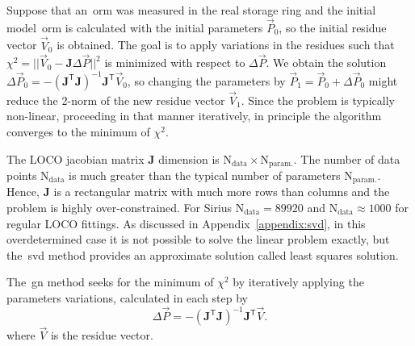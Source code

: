 Suppose that an~\gls{orm} was measured in the real storage ring and the initial model~\gls{orm} is calculated with the initial parameters $\vec{P}_0$, so the initial residue vector $\vec{V}_0$ is obtained. The goal is to apply variations in the residues such that $\chi^{2} = ||\vec{V}_0 - \mathbf{J}\Delta\vec{P}||^2 $ is minimized with respect to $\Delta\vec{P}$. We obtain the solution $\Delta \vec{P}_0 = -\left(\mathbf{J}^{\mathsf{T}}\mathbf{J}\right)^{-1}\mathbf{J}^{\mathsf{T}}\vec{V}_0$, so changing the parameters by $\vec{P}_1 = \vec{P}_0 + \Delta \vec{P}_0$ might reduce the 2-norm of the new residue vector $\vec{V}_1$. Since the problem is typically non-linear, proceeding in that manner iteratively, in principle the algorithm converges to the minimum of $\chi^2$.

The LOCO jacobian matrix $\mathbf{J}$ dimension is $\mathrm{N}_{\mathrm{data}} \times \mathrm{N}_{\mathrm{param.}}$. The number of data points $\mathrm{N}_{\mathrm{data}}$ is much greater than the typical number of parameters $\mathrm{N}_{\mathrm{param.}}$. Hence, $\mathbf{J}$ is a rectangular matrix with much more rows than columns and the problem is highly over-constrained. For Sirius $\mathrm{N}_{\mathrm{data}} = 89920$ and $\mathrm{N}_{\mathrm{data}} \approx 1000$ for regular LOCO fittings. As discussed in Appendix~\ref{appendix:svd}, in this overdetermined case it is not possible to solve the linear problem exactly, but the~\gls{svd} method provides an approximate solution called least squares solution.

The~\gls{gn} method seeks for the minimum of $\chi^2$ by iteratively applying the parameters variations, calculated in each step by
\begin{equation}
    \Delta \vec{P} = - \left(\mathbf{J}^{\mathsf{T}} \mathbf{J}\right)^{-1}\mathbf{J}^{\mathsf{T}} \vec{V}.
\end{equation}
where $\vec{V}$ is the residue vector.


